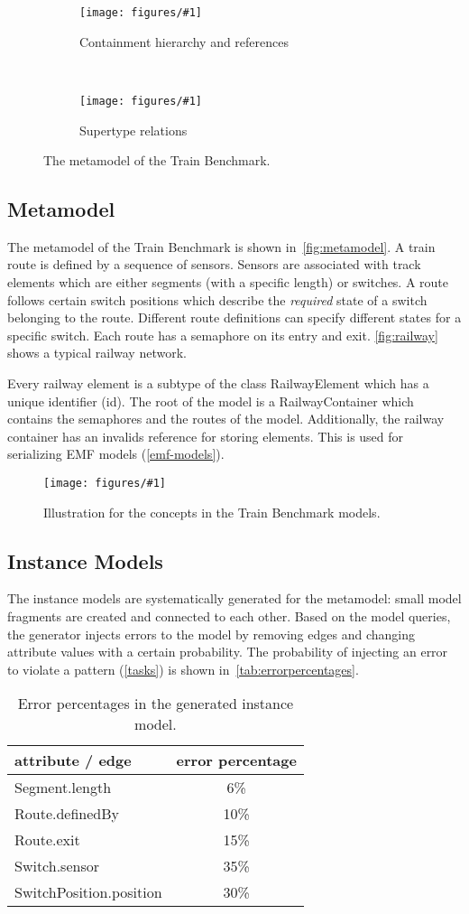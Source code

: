 \documentclass[submission,copyright,creativecommons]{eptcs}
\newcommand{\tb}{Train Benchmark\xspace}
\newcommand{\figref}[1]{\autoref{fig:#1}}
\newcommand{\ttcfig}[2]{
\begin{figure}[htb] 
	\centering
	\texttt{[image: figures/\#1]}
	\caption{#2.}
	\label{fig:#1}
\end{figure}}
\newcommand{\ttcsubfig}[2]{
	\begin{subfigure}[b]{\textwidth}
		\centering
		\texttt{[image: figures/\#1]}
		\caption{#2}
		\label{fig:#1}
	\end{subfigure}
}
\begin{document}
\begin{figure}
	\centering
	\ttcsubfig{railway-containments}{Containment hierarchy and references}
	~
	\ttcsubfig{railway-inheritance}{Supertype relations}
	\caption{The metamodel of the \tb.}
	\label{fig:metamodel}
\end{figure}

\subsection{Metamodel}

The metamodel of the \tb is shown in~\figref{metamodel}. A train \textsf{route} is defined by a sequence of \textsf{sensor}s. Sensors are associated with \textsf{track elements} which are either \textsf{segment}s (with a specific length) or \textsf{switch}es. A route follows certain \textsf{switch positions} which describe the \emph{required} state of a switch belonging to the route. Different route definitions can specify different states for a specific switch. Each route has a \textsf{semaphore} on its entry and exit. \figref{railway} shows a typical railway network.

Every railway element is a subtype of the class \textsf{RailwayElement} which has a unique identifier (\textsf{id}). The root of the model is a \textsf{RailwayContainer} which contains the semaphores and the routes of the model. Additionally, the railway container has an \textsf{invalids} reference for storing elements. This is used for serializing EMF models (\autoref{emf-models}). 

\ttcfig{railway}{Illustration for the concepts in the \tb models}

\subsection{Instance Models}
\label{instancemodels}

The instance models are systematically generated for the metamodel: small model fragments are created and connected to each other. Based on the model queries, the generator injects errors to the model by removing edges and changing attribute values with a certain probability. The probability of injecting an error to violate a pattern (\autoref{tasks}) is shown in~\autoref{tab:errorpercentages}.

\begin{table}
\centering
\begin{tabular}{ | l | c | }
\hline
\bf attribute / edge & \bf error percentage \\\hline
\sf Segment.length          & 6\%  \\\hline
\sf Route.definedBy         & 10\% \\\hline
\sf Route.exit              & 15\% \\\hline
\sf Switch.sensor           & 35\% \\\hline
\sf SwitchPosition.position & 30\% \\\hline
\end{tabular}
\caption{Error percentages in the generated instance model.}
\label{tab:errorpercentages}
\end{table}
\end{document}
